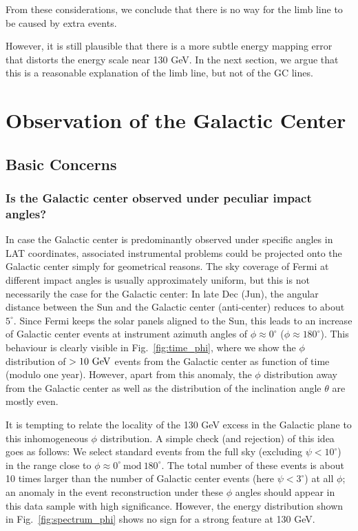 \documentclass[aps,twocolumn,prd,superscriptaddress,showpacs,nofootinbib,fixfloat]{revtex4}
\newcommand{\GeV}{{\rm ~GeV}}
\begin{document}
From these considerations, we conclude that there is no way for the limb line
to be caused by extra events. 

However, it is still plausible that there is a more subtle energy mapping
error that distorts the energy scale near 130 GeV.  In the next section, we
argue that this is a reasonable explanation of the limb line, but not of the
GC lines. 

\section{Observation of the Galactic Center}

\subsection{Basic Concerns}
\subsubsection{Is the Galactic center observed under peculiar impact angles?}

In case the Galactic center is predominantly observed under specific angles in
LAT coordinates, associated instrumental problems could be projected onto the
Galactic center simply for geometrical reasons. The sky coverage of Fermi at
different impact angles is usually approximately uniform, but this is not
necessarily the case for the Galactic center: In late Dec (Jun), the angular
distance between the Sun and the Galactic center (anti-center) reduces to
about $5^\circ$.  Since Fermi keeps the solar panels aligned to the Sun, this
leads to an increase of Galactic center events at instrument azimuth angles of
$\phi\approx 0^\circ$ ($\phi\approx 180^\circ$). This behaviour is clearly
visible in Fig.~\ref{fig:time_phi}, where we show the $\phi$ distribution of
$>10\GeV$ events from the Galactic center as function of time (modulo one
year).  However, apart from this anomaly, the $\phi$ distribution away from
the Galactic center as well as the distribution of the inclination angle
$\theta$ are mostly even.

It is tempting to relate the locality of the 130 GeV excess in the Galactic
plane to this inhomogeneous $\phi$ distribution. A simple check (and
rejection) of this idea goes as follows: We select standard events from the
full sky (excluding $\psi < 10^\circ$) in the range close to $\phi\approx
0^\circ\ \text{mod}\ 180^\circ$. The total number of these events is about 10
times larger than the number of Galactic center events (here $\psi<3^\circ$)
at all $\phi$; an anomaly in the event reconstruction under these $\phi$
angles should appear in this data sample with high significance. However, the
energy distribution shown in Fig.~\ref{fig:spectrum_phi} shows no sign for a
strong feature at 130 GeV.
\end{document}
